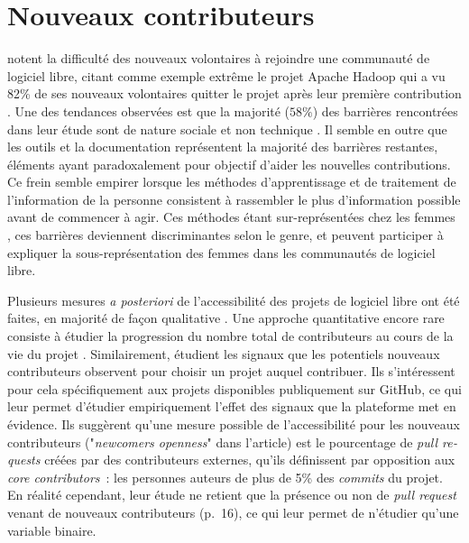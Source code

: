 \documentclass[dvipsnames,runningheads]{llncs}
\newcommand{\en}[1]{\foreignlanguage{english}{\emph{#1}}}
\begin{document}
    \section{Nouveaux contributeurs}

    \textcite{barriers-2018} notent la difficulté des nouveaux volontaires à rejoindre une communauté de
    logiciel libre, citant comme exemple extrême le projet Apache Hadoop qui a vu 82\% de ses nouveaux
    volontaires quitter le projet après leur première contribution \parencite{hadoop-dropout-2013}. Une des
    tendances observées est que la majorité ($58\%$) des barrières rencontrées dans leur étude sont de nature
    sociale et non technique \parencite[p.~1008]{barriers-2018}. Il semble en outre que les outils et la
    documentation représentent la majorité des barrières restantes, éléments ayant paradoxalement
    pour objectif d'aider les nouvelles contributions. Ce frein semble empirer lorsque les méthodes
    d'apprentissage et de traitement de l'information de la personne consistent à rassembler le plus
    d'information possible avant de commencer à agir. Ces méthodes étant sur-représentées chez les femmes
    \parencite{gender-information-processing-1995,gender-information-processing-2015}, ces barrières
    deviennent discriminantes selon le genre, et peuvent participer à expliquer la sous-représentation des
    femmes dans les communautés de logiciel libre.

    \label{sec:accessibility-measure}
    Plusieurs mesures \emph{a posteriori} de l'accessibilité des projets de logiciel libre ont été faites, en
    majorité de façon qualitative
    \parencites{newcomers-accessibility-2016}{newcomers-onboarding-2018}{newcomers-adaptation-2005}. Une
    approche quantitative encore rare consiste à étudier la progression du nombre total de contributeurs au
    cours de la vie du projet \cite{contributor-count-2006}. Similairement, \textcite{signals-2019} étudient
    les signaux que les potentiels nouveaux contributeurs observent pour choisir un projet auquel contribuer.
    Ils s'intéressent pour cela spécifiquement aux projets disponibles publiquement sur GitHub, ce qui leur
    permet d'étudier empiriquement l'effet des signaux que la plateforme met en évidence. Ils suggèrent qu'une
    mesure possible de l'accessibilité pour les nouveaux contributeurs ("\en{newcomers openness}" dans
    l'article) est le pourcentage de \en{pull requests} créées par des contributeurs externes, qu'ils
    définissent par opposition aux \en{core contributors} : les personnes auteurs de plus de 5\% des
    \en{commits} du projet. En réalité cependant, leur étude ne retient que la présence ou non de \en{pull
    request} venant de nouveaux contributeurs (p.~16), ce qui leur permet de n'étudier qu'une variable
    binaire.
\end{document}
